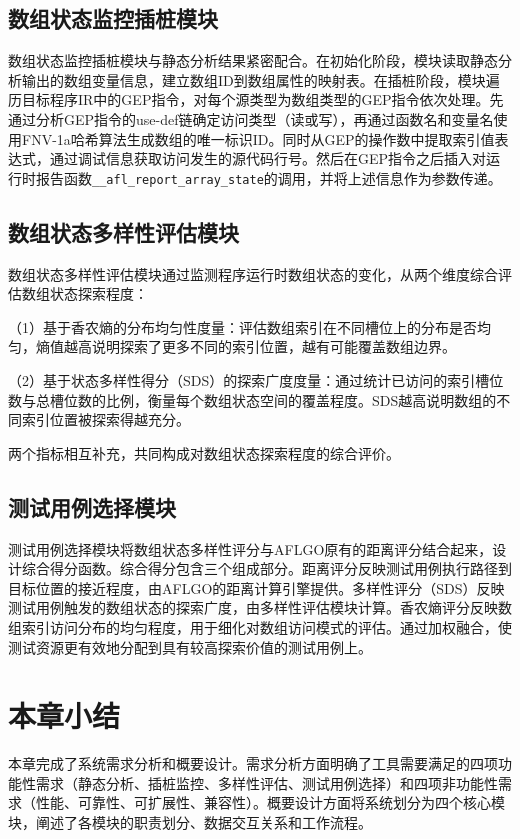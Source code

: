 \documentclass[bachelor]{njupthesis}
\begin{document}
\subsection{数组状态监控插桩模块}

数组状态监控插桩模块与静态分析结果紧密配合。在初始化阶段，模块读取静态分析输出的数组变量信息，建立数组ID到数组属性的映射表。在插桩阶段，模块遍历目标程序IR中的GEP指令，对每个源类型为数组类型的GEP指令依次处理。先通过分析GEP指令的use-def链确定访问类型（读或写），再通过函数名和变量名使用FNV-1a哈希算法生成数组的唯一标识ID。同时从GEP的操作数中提取索引值表达式，通过调试信息获取访问发生的源代码行号。然后在GEP指令之后插入对运行时报告函数\texttt{\_\_afl\_report\_array\_state}的调用，并将上述信息作为参数传递。

\subsection{数组状态多样性评估模块}

数组状态多样性评估模块通过监测程序运行时数组状态的变化，从两个维度综合评估数组状态探索程度：

（1）基于香农熵的分布均匀性度量：评估数组索引在不同槽位上的分布是否均匀，熵值越高说明探索了更多不同的索引位置，越有可能覆盖数组边界。

（2）基于状态多样性得分（SDS）的探索广度度量：通过统计已访问的索引槽位数与总槽位数的比例，衡量每个数组状态空间的覆盖程度。SDS越高说明数组的不同索引位置被探索得越充分。

两个指标相互补充，共同构成对数组状态探索程度的综合评价。

\subsection{测试用例选择模块}

测试用例选择模块将数组状态多样性评分与AFLGO原有的距离评分结合起来，设计综合得分函数。综合得分包含三个组成部分。距离评分反映测试用例执行路径到目标位置的接近程度，由AFLGO的距离计算引擎提供。多样性评分（SDS）反映测试用例触发的数组状态的探索广度，由多样性评估模块计算。香农熵评分反映数组索引访问分布的均匀程度，用于细化对数组访问模式的评估。通过加权融合，使测试资源更有效地分配到具有较高探索价值的测试用例上。

\section{本章小结}

本章完成了系统需求分析和概要设计。需求分析方面明确了工具需要满足的四项功能性需求（静态分析、插桩监控、多样性评估、测试用例选择）和四项非功能性需求（性能、可靠性、可扩展性、兼容性）。概要设计方面将系统划分为四个核心模块，阐述了各模块的职责划分、数据交互关系和工作流程。
\end{document}

